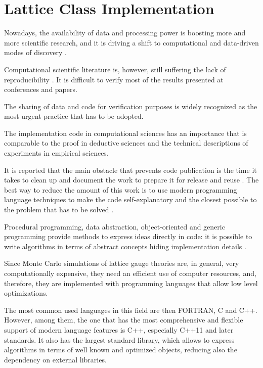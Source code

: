 \chapter{Lattice Class Implementation}\label{ch:lattice}

Nowadays, the availability of data and processing power is boosting more and more scientific research,
and it is driving a shift to computational and data-driven modes of discovery \cite{nielsen:2011}.

Computational scientific literature is, however, still suffering the lack of reproducibility \cite{reproducible:2009}.
It is difficult to verify most of the results presented at conferences and papers.

The sharing of data and code for verification purposes \cite{reproducible:2012}
is widely recognized as the most urgent practice that has to be adopted.

The implementation code in computational sciences has an importance that is comparable to the proof in deductive sciences \cite{topten}
and the technical descriptions of experiments in empirical sciences.

It is reported that the main obstacle that prevents code publication is the time it takes to clean up and document the work to prepare it for release and reuse \cite{obstacles}.
The best way to reduce the amount of this work is to use modern programming language techniques to make the code self-explanatory
and the closest possible to the problem that has to be solved \cite{best_pratices}.

Procedural programming, data abstraction, object-oriented and generic programming provide methods to express ideas directly in code:
it is possible to write algorithms in terms of abstract concepts hiding implementation details \cite{stroustrup:2013}.

Since Monte Carlo simulations of lattice gauge theories are, in general, very computationally expensive,
they need an efficient use of computer resources, and, therefore, they are implemented with programming languages that allow low level optimizations.

The most common used languages in this field are then FORTRAN, C and C++.
However, among them, the one that has the most comprehensive and flexible support of modern language features is C++,
especially C++11 and later standards.
It also has the largest standard library,
which allows to express algorithms in terms of well known and optimized objects, 
reducing also the dependency on external libraries.


